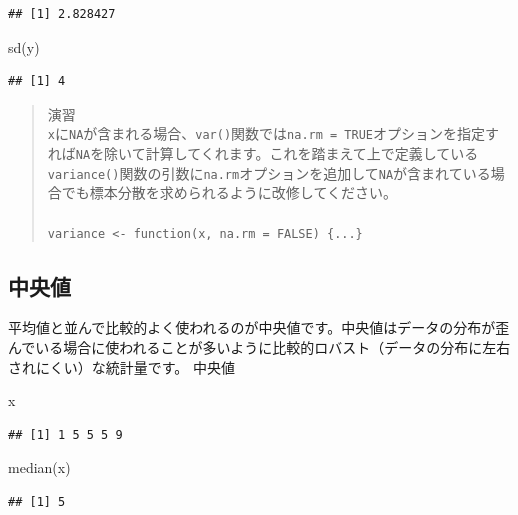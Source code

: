\documentclass[
  12pt,
]{book}
\newenvironment{Shaded}{\begin{snugshade}}{\end{snugshade}}
\newcommand{\FunctionTok}[1]{\textcolor[rgb]{0.00,0.00,0.00}{#1}}
\newcommand{\NormalTok}[1]{#1}
\begin{document}
\begin{verbatim}
## [1] 2.828427
\end{verbatim}

\begin{Shaded}
\begin{Highlighting}[]
\FunctionTok{sd}\NormalTok{(y)}
\end{Highlighting}
\end{Shaded}

\begin{verbatim}
## [1] 4
\end{verbatim}

\begin{quote}
演習\\
\texttt{x}に\texttt{NA}が含まれる場合、\texttt{var()}関数では\texttt{na.rm\ =\ TRUE}オプションを指定すれば\texttt{NA}を除いて計算してくれます。これを踏まえて上で定義している\texttt{variance()}関数の引数に\texttt{na.rm}オプションを追加して\texttt{NA}が含まれている場合でも標本分散を求められるように改修してください。\\
　\\
\texttt{variance\ \textless{}-\ function(x,\ na.rm\ =\ FALSE)\ \{...\}}
\end{quote}

\hypertarget{ux4e2dux592eux5024}{%
\subsection{中央値}\label{ux4e2dux592eux5024}}

平均値と並んで比較的よく使われるのが中央値です。中央値はデータの分布が歪んでいる場合に使われることが多いように比較的ロバスト（データの分布に左右されにくい）な統計量です。 中央値

\begin{Shaded}
\begin{Highlighting}[]
\NormalTok{x}
\end{Highlighting}
\end{Shaded}

\begin{verbatim}
## [1] 1 5 5 5 9
\end{verbatim}

\begin{Shaded}
\begin{Highlighting}[]
\FunctionTok{median}\NormalTok{(x)}
\end{Highlighting}
\end{Shaded}

\begin{verbatim}
## [1] 5
\end{verbatim}
\end{document}
